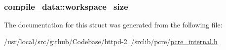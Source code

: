 \subsubsection[{\texorpdfstring{workspace\+\_\+size}{workspace_size}}]{ compile\+\_\+data\+::workspace\+\_\+size}\hypertarget{structcompile__data_a750c8953276fc2c3ce0aa73de571cae7}{}\label{structcompile__data_a750c8953276fc2c3ce0aa73de571cae7}


The documentation for this struct was generated from the following file\+:\begin{DoxyCompactItemize}
\item 
/usr/local/src/github/\+Codebase/httpd-\/2../srclib/pcre/\hyperlink{pcre__internal_8h}{pcre\+\_\+internal.\+h}\end{DoxyCompactItemize}
